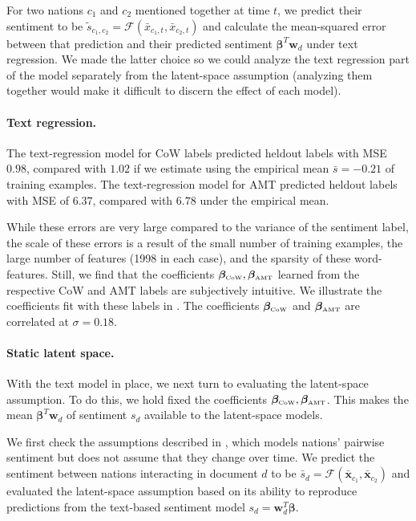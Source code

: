 For two nations $c_1$ and $c_2$ mentioned together at time $t$, we
predict their sentiment to be $\tilde s_{c_1, c_2} = \mathcal{F}(\bar
x_{c_1,t}, \bar x_{c_2, t})$ and calculate the mean-squared error
between that prediction and their predicted sentiment $\bm \beta^T \bm
w_d$ under text regression. We made the latter choice so we could
analyze the text regression part of the model separately from the
latent-space assumption (analyzing them together would make it
difficult to discern the effect of each model).

\paragraph{Text regression.} The text-regression model for CoW labels
predicted heldout labels with MSE $0.98$, compared with $1.02$ if we
estimate using the empirical mean $\bar s=-0.21$ of training
examples. The text-regression model for AMT predicted heldout labels
with MSE of $6.37$, compared with $6.78$ under the empirical mean.

While these errors are very large compared to the variance of the
sentiment label, the scale of these errors is a result of the small
number of training examples, the large number of features (1998 in
each case), and the sparsity of these word-features.  Still, we find that
the coefficients $\bm \beta_{\mbox{\tiny CoW}}, \bm \beta_{\mbox{\tiny
    AMT}}$ learned from the respective CoW and AMT labels are
subjectively intuitive.  We illustrate the coefficients fit with
these labels in .  The coefficients $\bm
\beta_{\mbox{\tiny CoW}}$ and $\bm \beta_{\mbox{\tiny AMT}}$ are
correlated at $\sigma=0.18$.

\paragraph{Static latent space.}
With the text model in place, we next turn to evaluating the
latent-space assumption.  To do this, we hold fixed the coefficients
$\bm \beta_{\mbox{\tiny CoW}}, \bm \beta_{\mbox{\tiny AMT}}$.  This
makes the mean $\bm \beta^T \bm w_d$ of sentiment $s_d$ available to
the latent-space models.

We first check the assumptions described in
, which models nations' pairwise
sentiment but does not assume that they change over time.  We predict
the sentiment between nations interacting in document $d$ to be
$\bar s_d = \mathcal{F}(\bm \bar x_{c_1}, \bm \bar x_{c_2})$ and
evaluated the latent-space assumption based on its ability to
reproduce predictions from the text-based sentiment model $s_d = \bm
w_d^T \bm \beta$.

